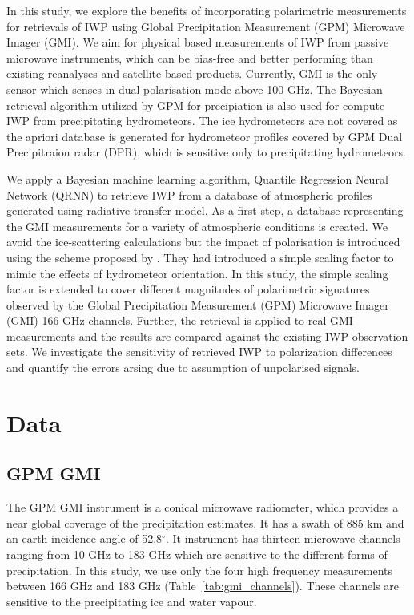 \documentclass[amt, manuscript]{copernicus}
\begin{document}
In this study, we explore the benefits of incorporating polarimetric measurements for retrievals of IWP using Global Precipitation Measurement (GPM) Microwave Imager (GMI). We aim for physical based measurements of IWP from passive microwave instruments, which can be bias-free and better performing than existing reanalyses and satellite based products. Currently, GMI is the only sensor which senses in dual polarisation mode above 100\,\,GHz. The Bayesian retrieval algorithm utilized by GPM for precipiation is also used for compute IWP from precipitating hydrometeors. The ice hydrometeors are not covered as the apriori database is generated for hydrometeor profiles covered by GPM Dual Precipitraion radar (DPR), which is sensitive only to precipitating hydrometeors. 

We apply a Bayesian machine learning algorithm, Quantile Regression Neural Network (QRNN) \citep{pfreundschuh:aneur:18} to retrieve IWP from a database of atmospheric profiles generated using radiative transfer model. As a first step, a database representing the GMI measurements for a variety of atmospheric conditions is created. We avoid the ice-scattering calculations but the impact of polarisation is introduced using the scheme proposed by \citet{barlakas:intro:21}. They had introduced a simple scaling factor to mimic the effects of hydrometeor orientation. In this study, the simple scaling factor is extended to cover different magnitudes of polarimetric signatures observed by the Global Precipitation Measurement (GPM) Microwave Imager (GMI) 166 GHz channels. Further, the retrieval is applied to real GMI measurements and the results are compared against the existing IWP observation sets. We investigate the sensitivity of retrieved IWP to polarization differences and  quantify the errors arsing due to assumption of unpolarised signals. 

\section{Data}

\subsection{GPM GMI}
The GPM GMI instrument is a conical microwave radiometer, which provides a near global coverage of the precipitation estimates. It has a swath of 885\,\,km  and an earth incidence angle of 52.8$^{\circ}$. It instrument has thirteen microwave channels ranging from 10\,\,GHz to 183\,\,GHz which are sensitive to the different forms of precipitation. In this study, we use only the four high frequency measurements between 166 GHz and 183 GHz (Table~\ref{tab:gmi_channels}). These channels are sensitive to the precipitating ice and water vapour.
\end{document}

